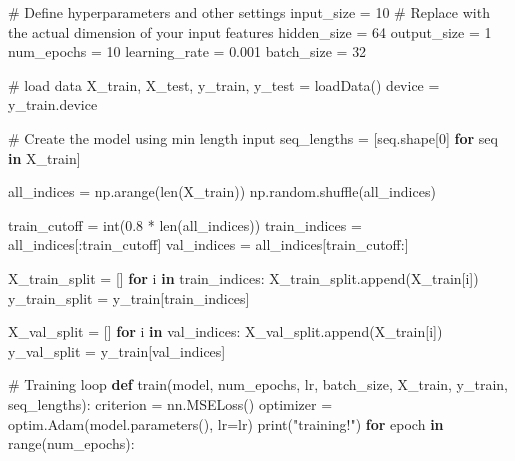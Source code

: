 \documentclass[
  letterpaper,
  DIV=11,
  numbers=noendperiod]{scrartcl}
\newenvironment{Shaded}{\begin{snugshade}}{\end{snugshade}}
\newcommand{\BuiltInTok}[1]{\textcolor[rgb]{0.00,0.23,0.31}{#1}}
\newcommand{\CommentTok}[1]{\textcolor[rgb]{0.37,0.37,0.37}{#1}}
\newcommand{\ControlFlowTok}[1]{\textcolor[rgb]{0.00,0.23,0.31}{\textbf{#1}}}
\newcommand{\DecValTok}[1]{\textcolor[rgb]{0.68,0.00,0.00}{#1}}
\newcommand{\FloatTok}[1]{\textcolor[rgb]{0.68,0.00,0.00}{#1}}
\newcommand{\KeywordTok}[1]{\textcolor[rgb]{0.00,0.23,0.31}{\textbf{#1}}}
\newcommand{\NormalTok}[1]{\textcolor[rgb]{0.00,0.23,0.31}{#1}}
\newcommand{\OperatorTok}[1]{\textcolor[rgb]{0.37,0.37,0.37}{#1}}
\newcommand{\StringTok}[1]{\textcolor[rgb]{0.13,0.47,0.30}{#1}}
\begin{document}
\begin{Shaded}
\begin{Highlighting}[]
\CommentTok{\# Define hyperparameters and other settings}
\NormalTok{input\_size }\OperatorTok{=} \DecValTok{10}  \CommentTok{\# Replace with the actual dimension of your input features}
\NormalTok{hidden\_size }\OperatorTok{=} \DecValTok{64}
\NormalTok{output\_size }\OperatorTok{=} \DecValTok{1}
\NormalTok{num\_epochs }\OperatorTok{=} \DecValTok{10}
\NormalTok{learning\_rate }\OperatorTok{=} \FloatTok{0.001}
\NormalTok{batch\_size }\OperatorTok{=} \DecValTok{32}


\CommentTok{\# load data}
\NormalTok{X\_train, X\_test, y\_train, y\_test }\OperatorTok{=}\NormalTok{ loadData()}
\NormalTok{device }\OperatorTok{=}\NormalTok{ y\_train.device}

\CommentTok{\# Create the model using min length input}
\NormalTok{seq\_lengths }\OperatorTok{=}\NormalTok{ [seq.shape[}\DecValTok{0}\NormalTok{] }\ControlFlowTok{for}\NormalTok{ seq }\KeywordTok{in}\NormalTok{ X\_train]}


\NormalTok{all\_indices }\OperatorTok{=}\NormalTok{ np.arange(}\BuiltInTok{len}\NormalTok{(X\_train))}
\NormalTok{np.random.shuffle(all\_indices)}

\NormalTok{train\_cutoff }\OperatorTok{=} \BuiltInTok{int}\NormalTok{(}\FloatTok{0.8} \OperatorTok{*} \BuiltInTok{len}\NormalTok{(all\_indices))}
\NormalTok{train\_indices }\OperatorTok{=}\NormalTok{ all\_indices[:train\_cutoff]}
\NormalTok{val\_indices   }\OperatorTok{=}\NormalTok{ all\_indices[train\_cutoff:]}


\NormalTok{X\_train\_split }\OperatorTok{=}\NormalTok{ []}
\ControlFlowTok{for}\NormalTok{ i }\KeywordTok{in}\NormalTok{ train\_indices:}
\NormalTok{    X\_train\_split.append(X\_train[i])}
\NormalTok{y\_train\_split }\OperatorTok{=}\NormalTok{ y\_train[train\_indices]}


\NormalTok{X\_val\_split }\OperatorTok{=}\NormalTok{ []}
\ControlFlowTok{for}\NormalTok{ i }\KeywordTok{in}\NormalTok{ val\_indices:}
\NormalTok{    X\_val\_split.append(X\_train[i])}
\NormalTok{y\_val\_split }\OperatorTok{=}\NormalTok{ y\_train[val\_indices]}


\CommentTok{\# Training loop}
\KeywordTok{def}\NormalTok{ train(model, num\_epochs, lr, batch\_size, X\_train, y\_train, seq\_lengths):}
\NormalTok{    criterion }\OperatorTok{=}\NormalTok{ nn.MSELoss()}
\NormalTok{    optimizer }\OperatorTok{=}\NormalTok{ optim.Adam(model.parameters(), lr}\OperatorTok{=}\NormalTok{lr)}
    \BuiltInTok{print}\NormalTok{(}\StringTok{"training!"}\NormalTok{)}
    \ControlFlowTok{for}\NormalTok{ epoch }\KeywordTok{in} \BuiltInTok{range}\NormalTok{(num\_epochs):}


\end{Highlighting}
\end{Shaded}
\end{document}

